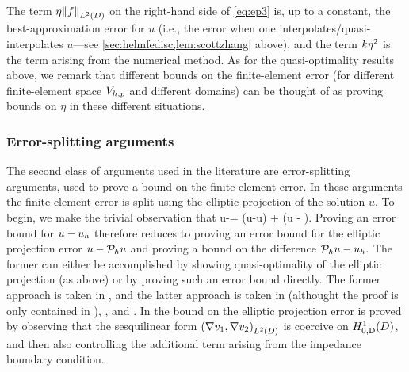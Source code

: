 The term $\wba\NLtD{f}$ on the right-hand side of \cref{eq:ep3} is, up to a constant, the best-approximation error for $u$ (i.e., the error when one interpolates/quasi-interpolates $u$---see \cref{sec:helmfedisc,lem:scottzhang} above), and the term $k\eta^2$ is the  term arising from the numerical method. As for the quasi-optimality results above, we remark that different bounds on the finite-element error (for different finite-element space $V_{h,p}$ and different domains) can be thought of as proving bounds on $\eta$ in these different situations.
\subsubsection{Error-splitting arguments}\label{sec:errorsplit}
The second class of arguments used in the literature are error-splitting arguments, used to prove a bound on the finite-element error. In these arguments the finite-element error is split using the elliptic projection of the solution $u$. To begin, we make the trivial observation that
\beqs\label{eq:split1}
u-\uh = \mleft(u-\Ph u\mright) + \mleft(\Ph u - \uh\mright).
\eeqs
Proving an error bound for $u-u_{h}$ therefore reduces to proving an error bound for the elliptic projection error $u- \mathcal P_{h} u$ and proving a bound on the difference $\mathcal P_{h} u - u_{h}.$ The former can either be accomplished by showing quasi-optimality of the elliptic projection (as above) or by proving such an error bound directly. The former approach is taken in \cite{DuWu:15,LiWu:18,ChGaNiTo:18}, and the latter approach is taken in \cite[Lemma 5.2]{FeWu:09} (althought the proof is only contained in \cite[Lemma 5.2]{FeWu:08}), \cite[Lemma 4.3]{FeWu:11}, and \cite[Lemma 4.2]{Wu:14}. In \cite{FeWu:09,FeWu:11,Wu:14} the bound on the elliptic projection error is proved by observing that the sesquilinear form $\IPLtD{\grad \vo}{\grad \vt}$ is coercive on $\HozDD$, and then also controlling the additional term arising from the impedance boundary condition.

